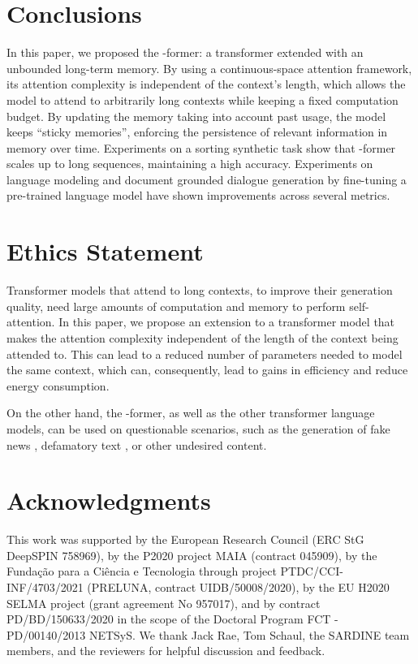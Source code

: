 \documentclass[11pt]{article}
\begin{document}
\section{Conclusions}
In this paper, we proposed the -former: a transformer extended with an unbounded long-term memory. By using a continuous-space attention framework, its attention complexity is independent of the context's length, 
which allows the model to attend to arbitrarily long contexts while keeping a fixed computation budget. 
By updating the memory taking into account past usage, the model keeps ``sticky memories'', enforcing the persistence of relevant information in memory over time. 
Experiments on a sorting synthetic task show that -former scales up to long sequences, maintaining a high accuracy. Experiments on language modeling and document grounded dialogue generation by fine-tuning a pre-trained language model have shown improvements across several metrics.

\section*{Ethics Statement}
Transformer models that attend to long contexts, to improve their generation quality, need large amounts of computation and memory to perform self-attention. In this paper, we propose an extension to a transformer model that makes the attention complexity independent of the length of the context being attended to. This can lead to a reduced number of parameters needed to model the same context, which can, consequently, lead to gains in efficiency and reduce energy consumption. 

On the other hand, the -former, as well as the other transformer language models, can be used on questionable scenarios, such as the generation of fake news \citep{zellers2019defending}, defamatory text \citep{wallace2019universal}, or other undesired content.

\section*{Acknowledgments}
This work was supported by the European Research Council (ERC StG DeepSPIN 758969), 
by the P2020 project MAIA (contract 045909), by the Funda\c{c}\~ao para a Ci\^encia e Tecnologia through project PTDC/CCI-INF/4703/2021 (PRELUNA, contract UIDB/50008/2020), by the EU H2020 SELMA project (grant agreement No 957017), and by contract PD/BD/150633/2020 in the scope of the  Doctoral Program  FCT - PD/00140/2013 NETSyS. We thank Jack Rae, Tom Schaul, the SARDINE team members, and the reviewers for helpful discussion and feedback.
\end{document}
